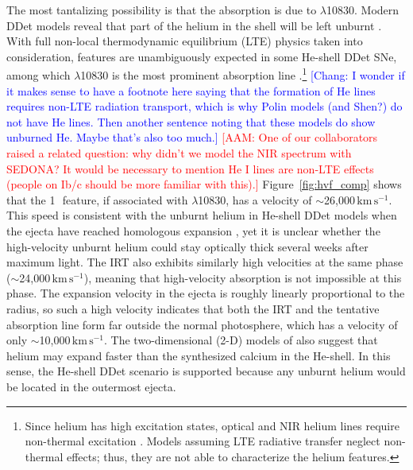 \documentclass[twocolumn]{aastex631}
\newcommand{\kms}{$\mathrm{km}\,\mathrm{s}^{-1}$}
\newcommand{\adam}[1]{\textcolor{red}{[AAM: #1]}}
\newcommand{\chang}[1]{\textcolor{blue}{[Chang: #1]}}
\begin{document}
The most tantalizing possibility is that the absorption is due to  $\lambda$10830. Modern DDet models reveal that part of the helium in the shell will be left unburnt \citep[e.g.,][]{Kromer_DD_2010,Woosley_2011,polin_observational_2019}. With full non-local thermodynamic equilibrium (LTE) physics taken into consideration,  features are unambiguously expected in some He-shell DDet SNe, among which  $\lambda$10830 is the most prominent absorption line \citep{Dessart_2015,Boyle2017_Helium}.\footnote{Since helium has high excitation states, optical and NIR helium lines require non-thermal excitation \citep[e.g., collision with fast electrons;][]{Lucy_1991}. Models assuming LTE radiative transfer neglect non-thermal effects; thus, they are not able to characterize the helium features.} \chang{I wonder if it makes sense to have a footnote here saying that the formation of He lines requires non-LTE radiation transport, which is why Polin models (and Shen?) do not have He lines. Then another sentence noting that these models do show unburned He. Maybe that's also too much.} \adam{One of our collaborators raised a related question: why didn't we model the NIR spectrum with SEDONA? It would be necessary to mention He I lines are non-LTE effects (people on Ib/c should be more familiar with this).}
Figure~\ref{fig:hvf_comp} shows that the 1\,\micron\ feature, if associated with  $\lambda$10830, has a velocity of $\sim$26,000\,\kms. This speed is consistent with the unburnt helium in He-shell DDet models when the ejecta have reached homologous expansion \citep{Kromer_DD_2010, polin_observational_2019}, yet it is unclear whether the high-velocity unburnt helium could stay optically thick several weeks after maximum light. The  IRT also exhibits similarly high velocities at the same phase ($\sim$24,000\,\kms), meaning that high-velocity absorption is not impossible at this phase. The expansion velocity in the ejecta is roughly linearly proportional to the radius, so such a high velocity indicates that both the  IRT and the tentative  absorption line form far outside the normal photosphere, which has a velocity of only $\sim$10,000\,\kms. The two-dimensional (2-D) models of \citet{Kromer_DD_2010} also suggest that helium may expand faster than the synthesized calcium in the He-shell. In this sense, the He-shell DDet scenario is supported because any unburnt helium would be located in the outermost ejecta.
\end{document}
